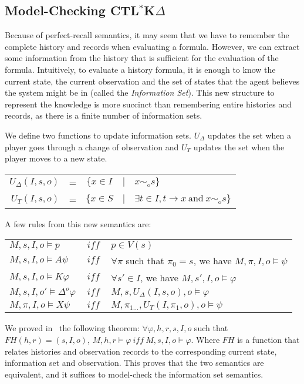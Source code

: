\documentclass[dvipsnames]{acmart}
\def\ctlskd{CTL$^{*}$K$\Delta$}
\def\A{\mathit{A}}
\def\X{\mathit{X}}
\def\K{\mathit{K}}
\def\D#1{\Delta^{#1}}
\def\eqstate#1{\sim_{#1}}
\def\iff{\ \mathit{iff}\ }
\def\UD{U_{\Delta}}
\def\UT{U_T}
\def\FV{\mathit{FH}}
\begin{document}
\subsection{Model-Checking \ctlskd}
Because of perfect-recall semantics, it may seem that we have to remember the complete history and records when evaluating a formula. However, we can extract some information from the history that is sufficient for the evaluation of the formula. Intuitively, to evaluate a history formula, it is enough to know the current state, the current observation and the set of states that the agent believes the system might be in (called the \textit{Information Set}). This new structure to represent the knowledge is more succinct than remembering entire histories and records, as there is a finite number of information sets.

We define two functions to update information sets. $\UD$ updates the set when a player goes through a change of observation and $\UT$ updates the set when the player moves to a new state. 
\begin{tabular}{r c c c l}
$\UD(I,s,o)$& = &$\{x\in I$ & $|$ & $x\eqstate{o}s\}$\\
$\UT(I,s,o)$& = &$\{x\in S$ & $|$ & $\exists t\in I, t\rightarrow x ~\text{and}~ x\eqstate{o}s\}$\\
\end{tabular}

A few rules from this new semantics are:
\begin{tabular}{l c l}
  $M,s,I,o\models p $&$ \iff $&$ p\in V(s)$\\
  $M,s,I,o\models\A\psi $&$ \iff $&$ \forall\pi$ such that $\pi_0=s$, we have $M,\pi,I,o\models\psi$\\
  $M,s,I,o\models\K\varphi $&$ \iff $&$ \forall s'\in I$, we have $M,s',I,o\models\varphi$\\
  $M,s,I,o'\models\D{o}\varphi $&$ \iff $&$ M,s,\UD(I,s,o),o\models\varphi$\\
  $M,\pi,I,o\models\X\psi $&$ \iff $&$ M,\pi_{1\dots},\UT(I,\pi_1,o),o\models\psi$\\
\end{tabular}

We proved in~\cite{internship} the following theorem:
$\forall \varphi,h,r,s,I,o$ such that $\FV(h,r)=(s,I,o)$, $M,h,r\models\varphi\iff M,s,I,o\models\varphi$.
Where $\FV$ is a function that relates histories and observation records to the corresponding current state, information set and observation.
This proves that the two semantics are equivalent, and it suffices to model-check the information set semantics.
\end{document}

